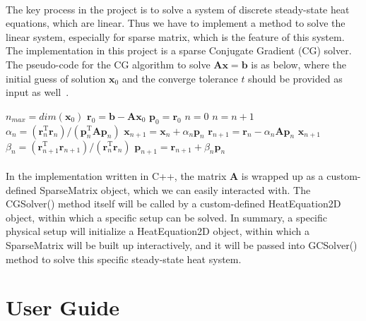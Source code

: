 \documentclass[12pt,letterpaper]{article}
\begin{document}
\paragraph{} The key process in the project is to solve a system of discrete steady-state heat equations, which are linear. Thus we have to implement a method to solve the linear system, especially for sparse matrix, which is the feature of this system. The implementation in this project is a sparse Conjugate Gradient (CG) solver. The pseudo-code for the CG algorithm to solve $\mathbf{Ax} = \mathbf{b}$ is as below, where the initial guess of solution $\mathbf{x}_0$ and the converge tolerance $t$ should be provided as input as well~\cite{CME211:ProjectPart2}.
\linebreak
\begin{algorithmic}
\State $n_{max} = dim(\mathbf{x}_0)$
\State $\mathbf{r}_0 = \mathbf{b} - \mathbf{A}\mathbf{x}_0$
\State $\mathbf{p}_0 = \mathbf{r}_0$
\State $n = 0$
    \State $n = n + 1$
    \State $\alpha_n = (\mathbf{r}_n^\mathrm{T}\mathbf{r}_n) / (\mathbf{p}_n^\mathrm{T}\mathbf{A}\mathbf{p}_n)$
    \State $\mathbf{x}_{n+1} = \mathbf{x}_n + \alpha_n\mathbf{p}_n$
    \State $\mathbf{r}_{n+1} = \mathbf{r}_n - \alpha_n\mathbf{A}\mathbf{p}_n$
        \State \Return $\mathbf{x}_{n+1}$
    \EndIf
    \State $\beta_n = (\mathbf{r}_{n+1}^\mathrm{T}\mathbf{r}_{n+1}) / (\mathbf{r}_n^\mathrm{T}\mathbf{r}_n)$
    \State $\mathbf{p}_{n+1} = \mathbf{r}_{n+1} + \beta_n\mathbf{p}_n$
\EndWhile
\EndFunction
\end{algorithmic}
\paragraph{} In the implementation written in C++, the matrix $\mathbf{A}$ is wrapped up as a custom-defined SparseMatrix object, which we can easily interacted with. The CGSolver() method itself will be called by a custom-defined HeatEquation2D object, within which a specific setup can be solved. In summary, a specific physical setup will initialize a HeatEquation2D object, within which a SparseMatrix will be built up interactively, and it will be passed into GCSolver() method to solve this specific steady-state heat system.
\section{User Guide}
\end{document}
